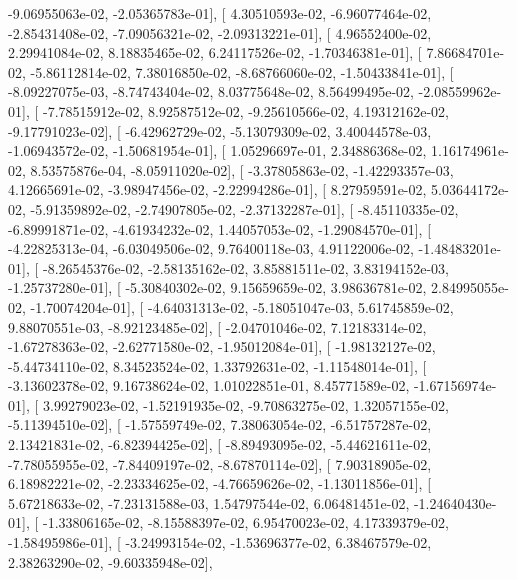 \documentclass{article}
\begin{document}
         -9.06955063e-02,  -2.05365783e-01],
       [  4.30510593e-02,  -6.96077464e-02,  -2.85431408e-02,
         -7.09056321e-02,  -2.09313221e-01],
       [  4.96552400e-02,   2.29941084e-02,   8.18835465e-02,
          6.24117526e-02,  -1.70346381e-01],
       [  7.86684701e-02,  -5.86112814e-02,   7.38016850e-02,
         -8.68766060e-02,  -1.50433841e-01],
       [ -8.09227075e-03,  -8.74743404e-02,   8.03775648e-02,
          8.56499495e-02,  -2.08559962e-01],
       [ -7.78515912e-02,   8.92587512e-02,  -9.25610566e-02,
          4.19312162e-02,  -9.17791023e-02],
       [ -6.42962729e-02,  -5.13079309e-02,   3.40044578e-03,
         -1.06943572e-02,  -1.50681954e-01],
       [  1.05296697e-01,   2.34886368e-02,   1.16174961e-02,
          8.53575876e-04,  -8.05911020e-02],
       [ -3.37805863e-02,  -1.42293357e-03,   4.12665691e-02,
         -3.98947456e-02,  -2.22994286e-01],
       [  8.27959591e-02,   5.03644172e-02,  -5.91359892e-02,
         -2.74907805e-02,  -2.37132287e-01],
       [ -8.45110335e-02,  -6.89991871e-02,  -4.61934232e-02,
          1.44057053e-02,  -1.29084570e-01],
       [ -4.22825313e-04,  -6.03049506e-02,   9.76400118e-03,
          4.91122006e-02,  -1.48483201e-01],
       [ -8.26545376e-02,  -2.58135162e-02,   3.85881511e-02,
          3.83194152e-03,  -1.25737280e-01],
       [ -5.30840302e-02,   9.15659659e-02,   3.98636781e-02,
          2.84995055e-02,  -1.70074204e-01],
       [ -4.64031313e-02,  -5.18051047e-03,   5.61745859e-02,
          9.88070551e-03,  -8.92123485e-02],
       [ -2.04701046e-02,   7.12183314e-02,  -1.67278363e-02,
         -2.62771580e-02,  -1.95012084e-01],
       [ -1.98132127e-02,  -5.44734110e-02,   8.34523524e-02,
          1.33792631e-02,  -1.11548014e-01],
       [ -3.13602378e-02,   9.16738624e-02,   1.01022851e-01,
          8.45771589e-02,  -1.67156974e-01],
       [  3.99279023e-02,  -1.52191935e-02,  -9.70863275e-02,
          1.32057155e-02,  -5.11394510e-02],
       [ -1.57559749e-02,   7.38063054e-02,  -6.51757287e-02,
          2.13421831e-02,  -6.82394425e-02],
       [ -8.89493095e-02,  -5.44621611e-02,  -7.78055955e-02,
         -7.84409197e-02,  -8.67870114e-02],
       [  7.90318905e-02,   6.18982221e-02,  -2.23334625e-02,
         -4.76659626e-02,  -1.13011856e-01],
       [  5.67218633e-02,  -7.23131588e-03,   1.54797544e-02,
          6.06481451e-02,  -1.24640430e-01],
       [ -1.33806165e-02,  -8.15588397e-02,   6.95470023e-02,
          4.17339379e-02,  -1.58495986e-01],
       [ -3.24993154e-02,  -1.53696377e-02,   6.38467579e-02,
          2.38263290e-02,  -9.60335948e-02],
\end{document}
